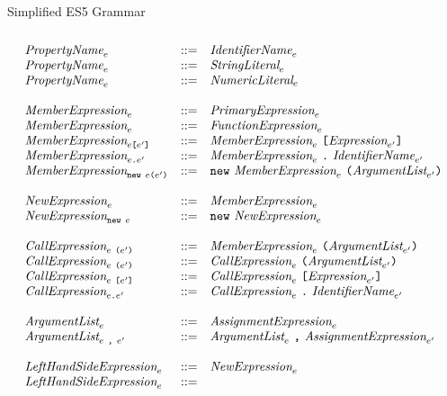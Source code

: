 \documentclass[preprint,10pt]{sigplanconf}
\begin{document}
\begin{displayfigure*}{\label{fig:grammar}Simplified ES5 Grammar}
\[\begin{array}{lcl}
  \\
  \textit{PropertyName}_{e} &::=&
  \textit{IdentifierName}_{e}
  \\
  \textit{PropertyName}_{e} &::=&
  \textit{StringLiteral}_{e}
  \\
  \textit{PropertyName}_{e} &::=&
  \textit{NumericLiteral}_{e}
  \\ \\
  \textit{MemberExpression}_{e} &::=&
  \textit{PrimaryExpression}_{e}
  \\
  \textit{MemberExpression}_{e} &::=&
  \textit{FunctionExpression}_{e}
  \\
  \textit{MemberExpression}_{e\texttt{[}e'\texttt{]}} &::=&
  \textit{MemberExpression}_{e}~\texttt{[}\textit{Expression}_{e'}\texttt{]}
  \\
  \textit{MemberExpression}_{e\texttt{.}e'} &::=&
  \textit{MemberExpression}_{e}~\texttt{.}~\textit{IdentifierName}_{e'}
  \\
  \textit{MemberExpression}_{\texttt{new}~e\texttt{(}e'\texttt{)}} &::=&
  \texttt{new}~\textit{MemberExpression}_{e}~\texttt{(}\textit{ArgumentList}_{e'}\texttt{)}
  \\ \\
  \textit{NewExpression}_{e} &::=&
  \textit{MemberExpression}_{e}
  \\
  \textit{NewExpression}_{\texttt{new}~e} &::=&
  \texttt{new}~\textit{NewExpression}_{e}
  \\ \\
  \textit{CallExpression}_{e~\texttt{(}e'\texttt{)}} &::=& 
  \textit{MemberExpression}_{e}~
  \texttt{(}\textit{ArgumentList}_{e'}\texttt{)}
  \\
  \textit{CallExpression}_{e~\texttt{(}e'\texttt{)}} &::=& 
  \textit{CallExpression}_{e}~
  \texttt{(}\textit{ArgumentList}_{e'}\texttt{)}
  \\
  \textit{CallExpression}_{e~\texttt{[}e'\texttt{]}} &::=& 
  \textit{CallExpression}_{e}~
  \texttt{[}\textit{Expression}_{e'}\texttt{]}
  \\
  \textit{CallExpression}_{e\texttt{.}e'} &::=& 
  \textit{CallExpression}_{e}~\texttt{.}~
  \textit{IdentifierName}_{e'}
  \\ \\
  \textit{ArgumentList}_{e} &::=&
  \textit{AssignmentExpression}_{e}
  \\
  \textit{ArgumentList}_{e~\texttt{,}~e'} &::=&
  \textit{ArgumentList}_{e}~\texttt{,}~
  \textit{AssignmentExpression}_{e'}
  \\ \\
  \textit{LeftHandSideExpression}_{e} &::=&
  \textit{NewExpression}_{e}
  \\
  \textit{LeftHandSideExpression}_{e} &::=&

\end{array}\]
\end{displayfigure*}
\end{document}
